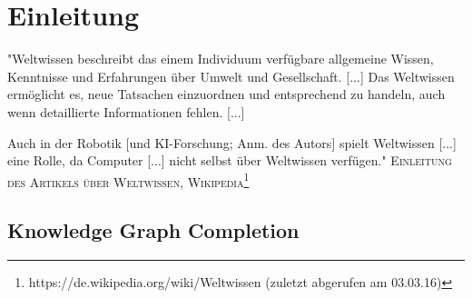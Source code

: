 
\chapter{Einleitung} %

\label{Chapter1} %


\newcommand{\keyword}[1]{\textbf{#1}}
\newcommand{\tabhead}[1]{\textbf{#1}}
\newcommand{\code}[1]{\texttt{#1}}
\newcommand{\file}[1]{\texttt{\bfseries#1}}
\newcommand{\option}[1]{\texttt{\itshape#1}}


\begin{itquote}
"Weltwissen beschreibt das einem Individuum verfügbare allgemeine Wissen, Kenntnisse und Erfahrungen über Umwelt und Gesellschaft. [...]
Das Weltwissen ermöglicht es, neue Tatsachen einzuordnen und entsprechend zu handeln, auch wenn detaillierte Informationen fehlen. [...]

Auch in der Robotik [und KI-Forschung; Anm. des Autors] spielt Weltwissen [...] eine Rolle,
da Computer [...] nicht selbst über Weltwissen verfügen."
\flushright
\textsc{Einleitung des Artikels über Weltwissen, Wikipedia\footnote{https://de.wikipedia.org/wiki/Weltwissen (zuletzt abgerufen am 03.03.16)}}
\end{itquote}

\section{Knowledge Graph Completion}

